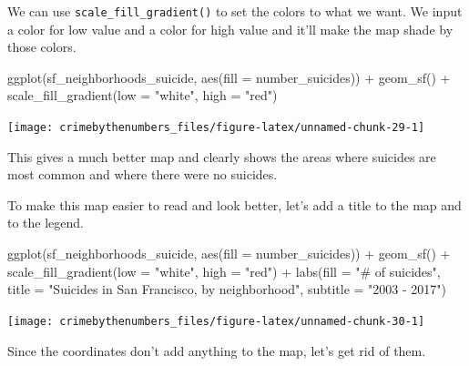 \documentclass[
  12pt,
]{book}
\newenvironment{Shaded}{\begin{snugshade}}{\end{snugshade}}
\newcommand{\AttributeTok}[1]{\textcolor[rgb]{0.61,0.61,0.61}{#1}}
\newcommand{\FunctionTok}[1]{\textcolor[rgb]{0,0,0}{#1}}
\newcommand{\NormalTok}[1]{#1}
\newcommand{\SpecialCharTok}[1]{\textcolor[rgb]{0,0,0}{#1}}
\newcommand{\StringTok}[1]{\textcolor[rgb]{0.5,0.5,0.5}{#1}}
\begin{document}
We can use \texttt{scale\_fill\_gradient()} to set the colors to what we want. We input a color for low value and a color for high value and it'll make the map shade by those colors.

\begin{Shaded}
\begin{Highlighting}[]
\FunctionTok{ggplot}\NormalTok{(sf\_neighborhoods\_suicide, }\FunctionTok{aes}\NormalTok{(}\AttributeTok{fill =}\NormalTok{ number\_suicides)) }\SpecialCharTok{+}
  \FunctionTok{geom\_sf}\NormalTok{() }\SpecialCharTok{+}
  \FunctionTok{scale\_fill\_gradient}\NormalTok{(}\AttributeTok{low =} \StringTok{"white"}\NormalTok{, }\AttributeTok{high =} \StringTok{"red"}\NormalTok{) }
\end{Highlighting}
\end{Shaded}

\begin{center}\texttt{[image: crimebythenumbers\_files/figure-latex/unnamed-chunk-29-1]} \end{center}

This gives a much better map and clearly shows the areas where suicides are most common and where there were no suicides.

To make this map easier to read and look better, let's add a title to the map and to the legend.

\begin{Shaded}
\begin{Highlighting}[]
\FunctionTok{ggplot}\NormalTok{(sf\_neighborhoods\_suicide, }\FunctionTok{aes}\NormalTok{(}\AttributeTok{fill =}\NormalTok{ number\_suicides)) }\SpecialCharTok{+}
  \FunctionTok{geom\_sf}\NormalTok{() }\SpecialCharTok{+}
  \FunctionTok{scale\_fill\_gradient}\NormalTok{(}\AttributeTok{low =} \StringTok{"white"}\NormalTok{, }\AttributeTok{high =} \StringTok{"red"}\NormalTok{) }\SpecialCharTok{+}
  \FunctionTok{labs}\NormalTok{(}\AttributeTok{fill =} \StringTok{"\# of suicides"}\NormalTok{,}
       \AttributeTok{title =} \StringTok{"Suicides in San Francisco, by neighborhood"}\NormalTok{,}
       \AttributeTok{subtitle =} \StringTok{"2003 {-} 2017"}\NormalTok{) }
\end{Highlighting}
\end{Shaded}

\begin{center}\texttt{[image: crimebythenumbers\_files/figure-latex/unnamed-chunk-30-1]} \end{center}

Since the coordinates don't add anything to the map, let's get rid of them.
\end{document}
